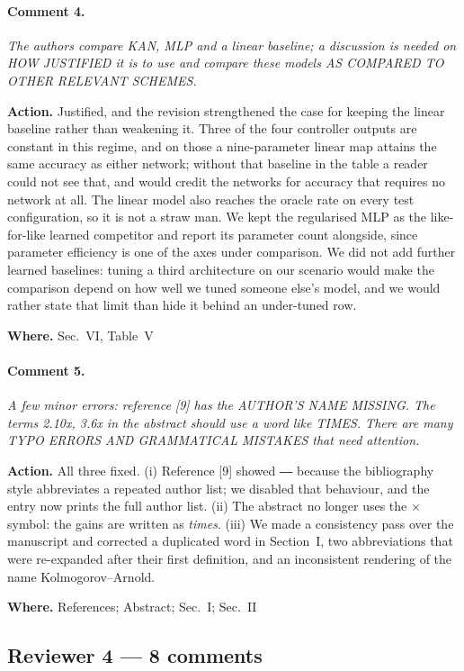 \documentclass[10pt]{article}
\newcommand{\rev}[1]{\par\medskip\noindent\textit{#1}\par\smallskip}
\newcommand{\act}[2]{\noindent\textbf{Action.} #1\par\noindent\textbf{Where.} #2\par}
\begin{document}
\paragraph{Comment 4.}
\rev{The authors compare KAN, MLP and a linear baseline; a discussion is needed on HOW JUSTIFIED it is to use and compare these models AS COMPARED TO OTHER RELEVANT SCHEMES.}
\act{Justified, and the revision strengthened the case for keeping the linear baseline rather than weakening it. Three of the four controller outputs are constant in this regime, and on those a nine-parameter linear map attains the same accuracy as either network; without that baseline in the table a reader could not see that, and would credit the networks for accuracy that requires no network at all. The linear model also reaches the oracle rate on every test configuration, so it is not a straw man. We kept the regularised MLP as the like-for-like learned competitor and report its parameter count alongside, since parameter efficiency is one of the axes under comparison. We did not add further learned baselines: tuning a third architecture on our scenario would make the comparison depend on how well we tuned someone else's model, and we would rather state that limit than hide it behind an under-tuned row.}{Sec.~VI, Table~V}

\paragraph{Comment 5.}
\rev{A few minor errors: reference [9] has the AUTHOR'S NAME MISSING. The terms 2.10x, 3.6x in the abstract should use a word like TIMES. There are many TYPO ERRORS AND GRAMMATICAL MISTAKES that need attention.}
\act{All three fixed. (i) Reference [9] showed \texttt{------} because the bibliography style abbreviates a repeated author list; we disabled that behaviour, and the entry now prints the full author list. (ii) The abstract no longer uses the $\times$ symbol: the gains are written as \emph{times}. (iii) We made a consistency pass over the manuscript and corrected a duplicated word in Section~I, two abbreviations that were re-expanded after their first definition, and an inconsistent rendering of the name Kolmogorov--Arnold.}{References; Abstract; Sec.~I; Sec.~II}

\subsection*{Reviewer 4 --- 8 comments}
\end{document}

